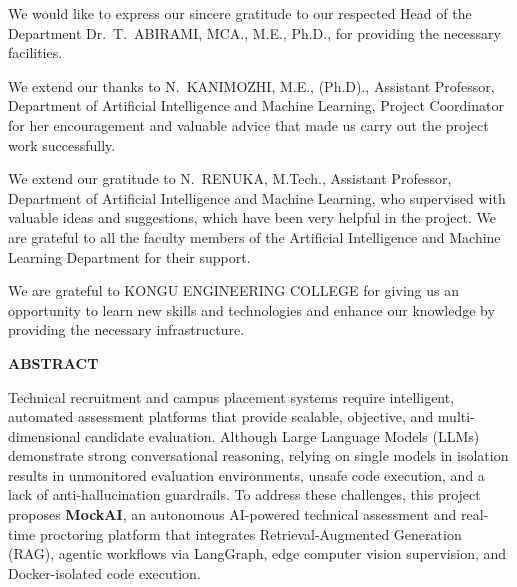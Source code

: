 \documentclass[12pt,a4paper]{report}
\begin{document}
\vspace{0.4cm}
\noindent We would like to express our sincere gratitude to our respected Head of the Department
Dr.\ T.\ ABIRAMI, MCA., M.E., Ph.D., for providing the necessary facilities.

\vspace{0.4cm}
\noindent We extend our thanks to N.\ KANIMOZHI, M.E., (Ph.D)., Assistant Professor, Department
of Artificial Intelligence and Machine Learning, Project Coordinator for her encouragement
and valuable advice that made us carry out the project work successfully.

\vspace{0.4cm}
\noindent We extend our gratitude to N.\ RENUKA, M.Tech., Assistant Professor, Department of
Artificial Intelligence and Machine Learning, who supervised with valuable ideas and
suggestions, which have been very helpful in the project. We are grateful to all the faculty
members of the Artificial Intelligence and Machine Learning Department for their support.

\vspace{0.4cm}
\noindent We are grateful to KONGU ENGINEERING COLLEGE for giving us an opportunity to
learn new skills and technologies and enhance our knowledge by providing the necessary
infrastructure.

\clearpage
\thispagestyle{plain}
\begin{center}
{\large\bfseries ABSTRACT}
\end{center}

\vspace{0.5cm}
\noindent Technical recruitment and campus placement systems require intelligent, automated
assessment platforms that provide scalable, objective, and multi-dimensional candidate
evaluation. Although Large Language Models (LLMs) demonstrate strong conversational
reasoning, relying on single models in isolation results in unmonitored evaluation
environments, unsafe code execution, and a lack of anti-hallucination guardrails. To address
these challenges, this project proposes \textbf{MockAI}, an autonomous AI-powered technical
assessment and real-time proctoring platform that integrates Retrieval-Augmented Generation
(RAG), agentic workflows via LangGraph, edge computer vision supervision, and
Docker-isolated code execution.
\end{document}
